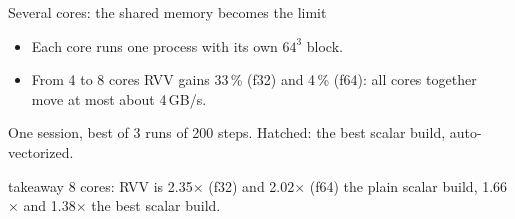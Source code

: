 \documentclass[aspectratio=169,10pt,t]{beamer}
\newcommand{\sx}[1]{#1\ensuremath{\times}} %
\newcommand{\takeaway}[1]{\par\vfill
  \begin{beamercolorbox}[wd=\textwidth,sep=4pt,rounded=true]{takeaway}
    \small #1
  \end{beamercolorbox}}
\begin{document}
\begin{frame}{Several cores: the shared memory becomes the limit}
  \vspace{1mm}
  \centering

  \vspace{1mm}
  \raggedright
  \begin{itemize}\small
    \item Each core runs one process with its own $64^3$ block.
    \item From 4 to 8 cores RVV gains 33\,\% (f32) and 4\,\% (f64): all cores together move
          at most about 4\,GB/s.
  \end{itemize}
  {\scriptsize\color{psgray}One session, best of 3 runs of 200 steps. Hatched: the best scalar
  build, auto-vectorized.\par}
  \takeaway{8 cores: RVV is \sx{2.35} (f32) and \sx{2.02} (f64) the plain scalar build, \sx{1.66}
    and \sx{1.38} the best scalar build.}
\end{frame}
\end{document}
